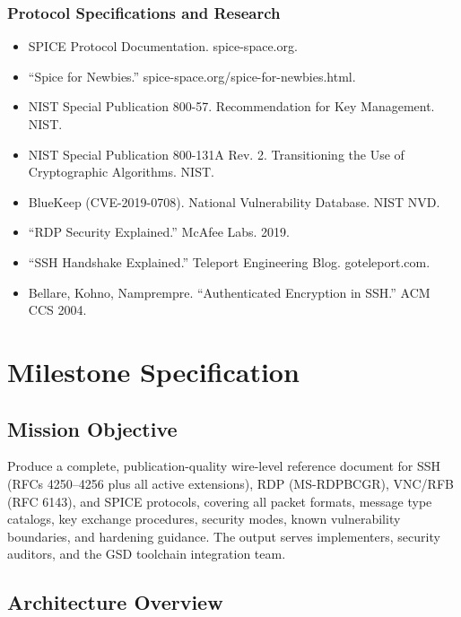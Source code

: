 \documentclass[11pt,letterpaper]{article}
\newcommand{\stageheader}[2]{%
  \noindent\colorbox{#2}{\makebox[\textwidth][l]{%
    \textcolor{white}{\bfseries\sffamily\hspace{6pt}#1\hspace{6pt}}}}%
  \vspace{0.5em}\par%
}
\begin{document}
\subsubsection{Protocol Specifications and Research}
\begin{itemize}
\item SPICE Protocol Documentation. spice-space.org.
\item ``Spice for Newbies.'' spice-space.org/spice-for-newbies.html.
\item NIST Special Publication 800-57. Recommendation for Key Management. NIST.
\item NIST Special Publication 800-131A Rev. 2. Transitioning the Use of Cryptographic Algorithms. NIST.
\item BlueKeep (CVE-2019-0708). National Vulnerability Database. NIST NVD.
\item ``RDP Security Explained.'' McAfee Labs. 2019.
\item ``SSH Handshake Explained.'' Teleport Engineering Blog. goteleport.com.
\item Bellare, Kohno, Namprempre. ``Authenticated Encryption in SSH.'' ACM CCS 2004.
\end{itemize}

\newpage
\stageheader{STAGE 3 --- MISSION PACKAGE}{tertiary}

\section{Milestone Specification}

\subsection{Mission Objective}

Produce a complete, publication-quality wire-level reference document for SSH (RFCs 4250--4256 plus all active extensions), RDP (MS-RDPBCGR), VNC/RFB (RFC 6143), and SPICE protocols, covering all packet formats, message type catalogs, key exchange procedures, security modes, known vulnerability boundaries, and hardening guidance. The output serves implementers, security auditors, and the GSD toolchain integration team.

\subsection{Architecture Overview}
\end{document}
